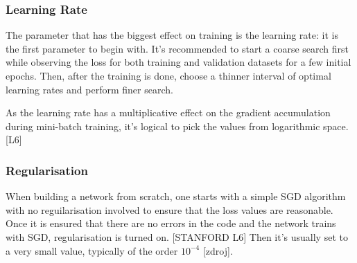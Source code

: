 \subsubsection{Learning Rate}

The parameter that has the biggest effect on training is the learning rate: it is the first parameter to begin with. It's recommended to start a coarse search first while observing the loss for both training and validation datasets for a few initial epochs. Then, after the training is done, choose a thinner interval of optimal learning rates and perform finer search. 

As the learning rate has a multiplicative effect on the gradient accumulation during mini-batch training, it's logical to pick the values from logarithmic space. [L6]

\subsubsection{Regularisation}

When building a network from scratch, one starts with a simple SGD algorithm with no reguilarisation involved to ensure that the loss values are reasonable. Once it is ensured that there are no errors in the code and the network trains with SGD, regularisation is turned on. [STANFORD L6] Then it's usually set to a very small value, typically of the order $ 10^{-4} $ [zdroj].



